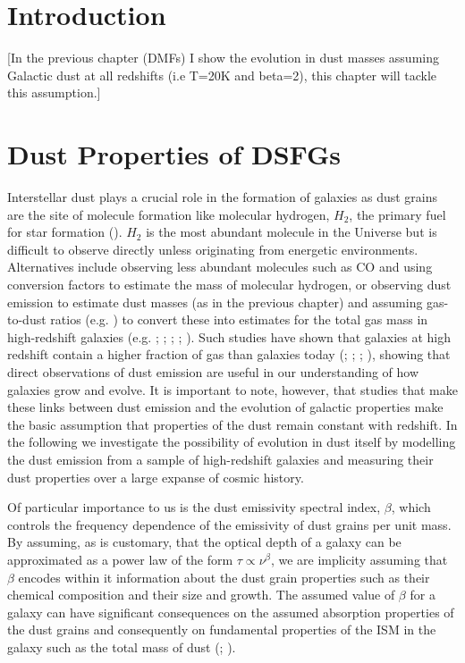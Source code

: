 \section{Introduction}

[In the previous chapter (DMFs) I show the evolution in dust masses assuming Galactic dust at all redshifts (i.e T=20K and beta=2), this chapter will tackle this assumption.]

\section{Dust Properties of DSFGs}

Interstellar dust plays a crucial role in the formation of galaxies as dust grains are the site of molecule formation like molecular hydrogen, $H_2$, the primary fuel for star formation (\citealt{Kennicutt_2012}). $H_2$ is the most abundant molecule in the Universe but is difficult to observe directly unless originating from energetic environments. Alternatives include observing less abundant molecules such as CO and using conversion factors to estimate the mass of molecular hydrogen, or observing dust emission to estimate dust masses (as in the previous chapter) and assuming gas-to-dust ratios (e.g. \citealt{Saintonge_2013}) to convert these into estimates for the total gas mass in high-redshift galaxies (e.g. \citealt{Magdis_2012}; \citealt{Eales_2012}; \citealt{Scoville_2014}; \citealt{Santini_2014}; \citealt{Genzel_2015}). Such studies have shown that galaxies at high redshift contain a higher fraction of gas than galaxies today (\citealt{Tacconi_2010}; \citealt{Scoville_2016}; \citealt{Scoville_2017}; \citealt{Millard_2020}), showing that direct observations of dust emission are useful in our understanding of how galaxies grow and evolve. It is important to note, however, that studies that make these links between dust emission and the evolution of galactic properties make the basic assumption that properties of the dust remain constant with redshift. In the following we investigate the possibility of evolution in dust itself by modelling the dust emission from a sample of high-redshift galaxies and measuring their dust properties over a large expanse of cosmic history.

Of particular importance to us is the dust emissivity spectral index, $\beta$, which controls the frequency dependence of the emissivity of dust grains per unit mass. By assuming, as is customary, that the optical depth of a galaxy can be approximated as a power law of the form $\tau \propto \nu^\beta$, we are implicity assuming that $\beta$ encodes within it information about the dust grain properties such as their chemical composition and their size and growth. The assumed value of $\beta$ for a galaxy can have significant consequences on the assumed absorption properties of the dust grains and consequently on fundamental properties of the ISM in the galaxy such as the total mass of dust (\citealt{Bianchi_2013}; \citealt{Clark_2016}).

